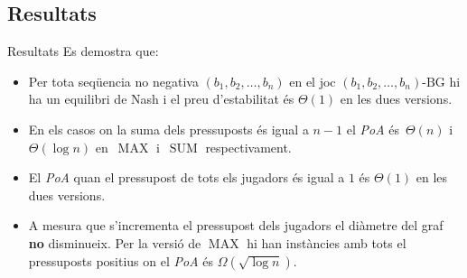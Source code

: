 \documentclass[aspectratio=169]{beamer}
\DeclareMathOperator{\SUM}{SUM}
\DeclareMathOperator{\MAX}{MAX}
\begin{document}
\subsection{Resultats}
\begin{frame}{Resultats}
Es demostra que:

\begin{itemize}[<+->] 

    
    \item Per tota seqüencia no negativa $ (b_1, b_2, \dots , b_n)$ en el joc $ (b_1, b_2, \dots , b_n)\text{-BG} $ hi ha un equilibri de Nash i el preu d'estabilitat és $\Theta(1)$ en les dues versions.
    
    \vspace{1em}
    
    \item En els casos on la suma dels pressuposts és igual a $n-1$ el \emph{PoA}
    és~$\Theta(n)$ i~$\Theta(\log n)$ en~$\MAX$ i~$\SUM$ respectivament.
    
    \vspace{1em}
    
    \item El \emph{PoA} quan el pressupost de tots els jugadors és igual a $1$ és $\Theta(1)$ en les dues versions.
    
    \vspace{1em}
    
    \item A mesura que s'incrementa el pressupost dels jugadors el diàmetre del graf \textbf{no} disminueix. Per la versió de $\MAX$ hi han instàncies amb tots el pressuposts positius on el \emph{PoA} és $\Omega(\sqrt{\log n})$.
    
\end{itemize}
\end{frame}
\end{document}
